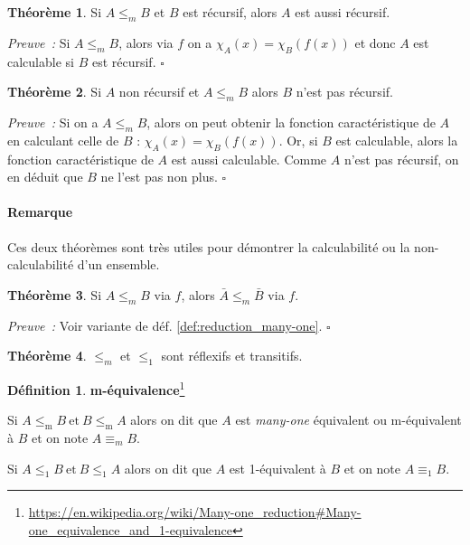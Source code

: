 \documentclass{book}
\theoremstyle{definition}
\newtheorem{theorem}{Théorème}
\newtheorem{definition}{Définition}
\numberwithin{lemma}{subsection}
\numberwithin{theorem}{subsection}
\numberwithin{definition}{subsection}
\numberwithin{proposition}{subsection}
\numberwithin{corollary}{subsection}
\numberwithin{property}{subsection}
\numberwithin{example}{subsection}
\numberwithin{heuristique}{subsection}
\numberwithin{scenario}{subsection}
\newenvironment{proofi} {\noindent\emph{Preuve~:}} {\hfill $\square$\vspace{0.2cm}}
\begin{document}
            \begin{theorem}
                Si $A \leq_m B$ et $B$ est récursif, alors $A$ est aussi récursif.
            \end{theorem}
            
            \begin{proofi}
                Si $A \leq_m B$, alors via $f$ on a $\chi_A(x) = \chi_B(f(x))$ et donc $A$ est calculable si $B$ est récursif.
            \end{proofi}
            
            \begin{theorem}
                Si $A$ non récursif et $A \leq_m B$ alors $B$ n'est pas récursif.
            \end{theorem}
            
            \begin{proofi}
                Si on a $A \leq_m B$, alors on peut obtenir la fonction caractéristique de $A$ en calculant celle de $B$ : $\chi_A(x) = \chi_B(f(x))$. Or, si $B$ est calculable, alors la fonction caractéristique de $A$ est aussi calculable. Comme $A$ n'est pas récursif, on en déduit que $B$ ne l'est pas non plus.
            \end{proofi}
            
            \paragraph{Remarque} Ces deux théorèmes sont très utiles pour démontrer la calculabilité ou la non-calculabilité d'un ensemble.
            
            \begin{theorem}
                Si $A \leq_m B$ via $f$, alors $\bar{A} \leq_m \bar{B}$ via $f$.
            \end{theorem}
            
            \begin{proofi}
                Voir variante de déf. \ref{def:reduction_many-one}.
            \end{proofi}
            
            \begin{theorem}\label{th:many_one_refl_trans}
                $\leq_m$ et $\leq_1$ sont réflexifs et transitifs.
            \end{theorem}
            
            \begin{definition}\textbf{m-équivalence}\footnote{\url{https://en.wikipedia.org/wiki/Many-one\_reduction\#Many-one\_equivalence\_and\_1-equivalence}}\label{def:m_equiv}
                \par Si $A \leq_{\mathrm{m}} B ~ \mathrm{ et } ~ B \leq_{\mathrm{m}} A$ alors on dit que $A$ est \textit{many-one} équivalent ou m-équivalent à $B$ et on note $A \equiv_m B$.
                \par Si $A \leq_{1} B ~ \mathrm{ et } ~ B \leq_{1} A$ alors on dit que $A$ est 1-équivalent à $B$ et on note $A \equiv_1 B$.
            \end{definition}
            
\end{document}
